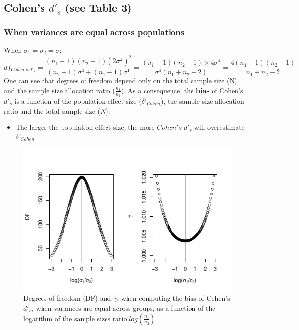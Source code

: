 \documentclass[
  man]{apa6}
\providecommand{\tightlist}{%
  \setlength{\itemsep}{0pt}\setlength{\parskip}{0pt}}
\begin{document}
\hypertarget{cohens-d_s-see-table-3}{%
\subsection{\texorpdfstring{Cohen's \(d'_s\) (see Table 3)}{Cohen's d'\_s (see Table 3)}}\label{cohens-d_s-see-table-3}}

\hypertarget{when-variances-are-equal-across-populations}{%
\subsubsection{When variances are equal across populations}\label{when-variances-are-equal-across-populations}}

When \(\sigma_1=\sigma_2=\sigma\):
\[df_{Cohen's \; d'_s} = \frac{(n_1-1)(n_2-1)(2\sigma^2)^2}{(n_2-1)\sigma^4+(n_1-1)\sigma^4} = \frac{(n_1-1)(n_2-1)\times 4\sigma^4}{\sigma^4(n_1+n_2-2)} = \frac{4(n_1-1)(n_2-1)}{n_1+n_2-2}\]
One can see that degrees of freedom depend only on the total sample size (N) and the sample size allocation ratio (\(\frac{n_1}{n_2}\)). As a consequence, the \textbf{bias} of Cohen's \(d'_s\) is a function of the population effect size (\(\delta'_{Cohen}\)), the sample size allocation ratio and the total sample size (\(N\)).

\begin{itemize}
\tightlist
\item
  The larger the population effect size, the more \(Cohen's \; d'_s\) will overestimate \(\delta'_{Cohen}\)
\end{itemize}

\begin{figure}
\centering
\includegraphics{Theoretical-Bias-of-all-estimators-as-a-function-of-population-parameters_files/figure-latex/biascohendprimehomNratio2-1.pdf}
\caption{\label{fig:biascohendprimehomNratio2}Degrees of freedom (DF) and \(\gamma\), when computing the bias of Cohen's \(d'_s\), when variances are equal across groups, as a function of the logarithm of the sample sizes ratio \(log\left(\frac{n_1}{n_2} \right)\)}
\end{figure}
\end{document}
